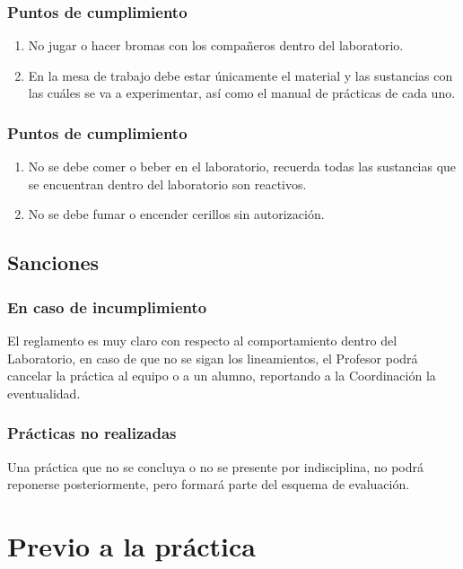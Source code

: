 \documentclass[14pt]{beamer}
\begin{document}
\begin{frame}
\frametitle{Puntos de cumplimiento}
\begin{enumerate}[<+->]
\item No jugar o hacer bromas con los compañeros dentro del laboratorio.
\item En la mesa de trabajo debe estar únicamente el material y las sustancias con las cuáles se va a experimentar, así como el manual de prácticas de cada uno.
\seti
\end{enumerate}
\end{frame}
\begin{frame}
\frametitle{Puntos de cumplimiento}
\begin{enumerate}[<+->]
\conti
\item No se debe comer o beber en el laboratorio, recuerda todas las sustancias que se encuentran dentro del laboratorio son reactivos.
\item No se debe fumar o encender cerillos sin autorización.
\end{enumerate}
\end{frame}

\subsection{Sanciones}

\begin{frame}
\frametitle{En caso de incumplimiento}
El reglamento es muy claro con respecto al comportamiento dentro del Laboratorio, \pause en caso de que no se sigan los lineamientos, el Profesor podrá cancelar la práctica al equipo o a un alumno, reportando a la Coordinación la eventualidad.
\end{frame}
\begin{frame}
\frametitle{Prácticas no realizadas}
Una práctica que no se concluya o no se presente por indisciplina, no podrá reponerse posteriormente, \pause pero formará parte del esquema de evaluación.
\end{frame}


\section{Previo a la práctica}
\end{document}
